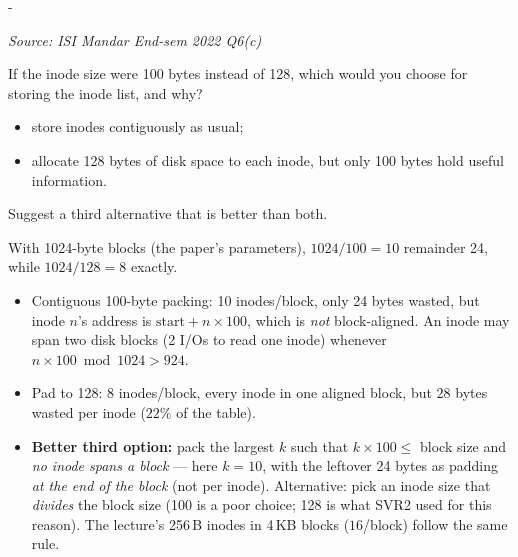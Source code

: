 \documentclass[11pt,a4paper]{article}
\makeatletter
\newcommand{\keepspace}[1]{\par\penalty-100\begingroup
  \setlength{\dimen@}{#1}\dimen@ii\pagegoal\advance\dimen@ii-\pagetotal
  \ifdim\dimen@>\dimen@ii\ifdim\dimen@ii>\z@\vfil\fi\break\fi\endgroup}
\newcounter{qn}[section]
\newenvironment{Qn}[4]{%
  \refstepcounter{qn}\keepspace{7\baselineskip}%
  \begin{tcolorbox}[qboxstyle, title={Q\thesection.\theqn\ \ [#1 \textbar\ #2]\ \ #4}]%
  {\footnotesize\color{g3}\textit{Source: #3}}\par\smallskip%
}{%
  \end{tcolorbox}%
}
\newenvironment{Sol}{%
  \begin{tcolorbox}[sboxstyle, title={Solution}]%
}{%
  \end{tcolorbox}\vspace{0.35em}%
}
\makeatother
\begin{document}
\begin{Qn}{Medium}{Lect 24}{ISI Mandar End-sem 2022 Q6(c)}{100-byte inodes: pack, pad, or a third option?}
If the inode size were 100 bytes instead of 128, which would you
choose for storing the inode list, and why?
\begin{itemize}
\item store inodes contiguously as usual;
\item allocate 128 bytes of disk space to each inode, but only 100
      bytes hold useful information.
\end{itemize}
Suggest a third alternative that is better than both.
\end{Qn}
\begin{Sol}
With 1024-byte blocks (the paper's parameters), $1024/100=10$
remainder 24, while $1024/128=8$ exactly.
\begin{itemize}
\item Contiguous 100-byte packing: 10 inodes/block, only 24 bytes
      wasted, but inode $n$'s address is
      $\mathrm{start}+n\times 100$, which is \emph{not}
      block-aligned. An inode may span two disk blocks (2 I/Os
      to read one inode) whenever $n\times 100 \bmod 1024 > 924$.
\item Pad to 128: 8 inodes/block, every inode in one aligned
      block, but $28$ bytes wasted per inode ($22\%$ of the table).
\item \textbf{Better third option:} pack the largest $k$ such that
      $k\times 100 \le$ block size and \emph{no inode spans a
      block} --- here $k=10$, with the leftover 24 bytes as
      padding \emph{at the end of the block} (not per inode).
      Alternative: pick an inode size that \emph{divides} the
      block size (100 is a poor choice; 128 is what SVR2 used
      for this reason). The lecture's 256\,B inodes in 4\,KB
      blocks ($16$/block) follow the same rule.
\end{itemize}
\end{Sol}
\end{document}

